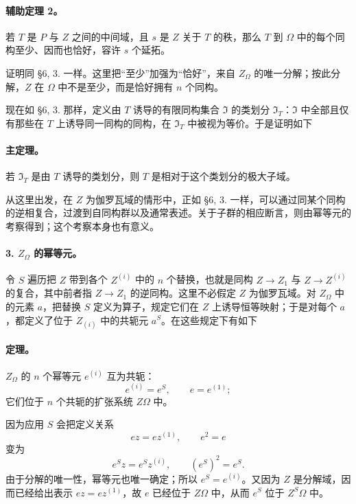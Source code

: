 \paragraph{辅助定理 2。}
若 \(T\) 是 \(P\) 与 \(Z\) 之间的中间域，且 \(s\) 是 \(Z\) 关于 \(T\) 的秩，那么 \(T\) 到 \(\Omega\) 中的每个同构至少、因而也恰好，容许 \(s\) 个延拓。

证明同 §6, 3. 一样。这里把“至少”加强为“恰好”，来自 \(Z_\Omega\) 的唯一分解；按此分解，\(Z\) 在 \(\Omega\) 中不是至少，而是恰好拥有 \(n\) 个同构。

现在如 §6, 3. 那样，定义由 \(T\) 诱导的有限同构集合 \(\mathfrak I\) 的类划分 \(\mathfrak I_T\)：\(\mathfrak I\) 中全部且仅有那些在 \(T\) 上诱导同一同构的同构，在 \(\mathfrak I_T\) 中被视为等价。于是证明如下

\paragraph{主定理。}
若 \(\mathfrak I_T\) 是由 \(T\) 诱导的类划分，则 \(T\) 是相对于这个类划分的极大子域。

从这里出发，在 \(Z\) 为伽罗瓦域的情形中，正如 §6, 3. 一样，可以通过同某个同构的逆相复合，过渡到自同构群以及通常表述。关于子群的相应断言，则由幂等元的考察得到；这个考察本身也有意义。

\paragraph{3. \(Z_\Omega\) 的幂等元。}
令 \(S\) 遍历把 \(Z\) 带到各个 \(Z^{(i)}\) 中的 \(n\) 个替换，也就是同构 \(Z\to Z_1\) 与 \(Z\to Z^{(i)}\) 的复合，其中前者指 \(Z\to Z_1\) 的逆同构。这里不必假定 \(Z\) 为伽罗瓦域。对 \(Z_\Omega\) 中的元素 \(a\)，把替换 \(S\) 定义为算子，规定它们在 \(Z\) 上诱导恒等映射；于是对每个 \(a\)，都定义了位于 \(Z_{(i)}\) 中的共轭元 \(a^S\)。在这些规定下有如下

\paragraph{定理。}
\(Z_\Omega\) 的 \(n\) 个幂等元 \(e^{(i)}\) 互为共轭：
\[
        e^{(i)}=e^S,\qquad e=e^{(1)};
\]
它们位于 \(n\) 个共轭的扩张系统 \(Z\Omega\) 中。

因为应用 \(S\) 会把定义关系
\[
        ez=ez^{(1)},\qquad e^2=e
\]
变为
\[
        e^S z=e^S z^{(i)},\qquad (e^S)^2=e^S .
\]
由于分解的唯一性，幂等元也唯一确定；所以 \(e^S=e^{(i)}\)。又因为 \(Z\) 是分解域，因而已经给出表示 \(ez=ez^{(1)}\)，故 \(e\) 已经位于 \(Z\Omega\) 中，从而 \(e^S\) 位于 \(Z^S\Omega\) 中。


